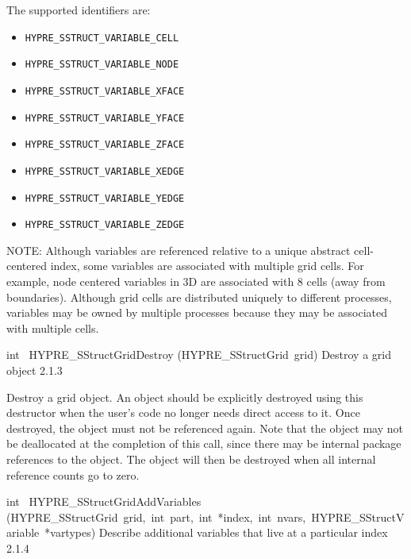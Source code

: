 \documentclass{article}
\begin{document}
\begin{cxxentry}
\begin{cxxentry}
\begin{cxxmacro}
\begin{cxxdoc}
The supported identifiers are:
\begin{itemize}
\item {\tt HYPRE\_SSTRUCT\_VARIABLE\_CELL}
\item {\tt HYPRE\_SSTRUCT\_VARIABLE\_NODE}
\item {\tt HYPRE\_SSTRUCT\_VARIABLE\_XFACE}
\item {\tt HYPRE\_SSTRUCT\_VARIABLE\_YFACE}
\item {\tt HYPRE\_SSTRUCT\_VARIABLE\_ZFACE}
\item {\tt HYPRE\_SSTRUCT\_VARIABLE\_XEDGE}
\item {\tt HYPRE\_SSTRUCT\_VARIABLE\_YEDGE}
\item {\tt HYPRE\_SSTRUCT\_VARIABLE\_ZEDGE}
\end{itemize}

NOTE: Although variables are referenced relative to a unique abstract
cell-centered index, some variables are associated with multiple grid cells.
For example, node centered variables in 3D are associated with 8 cells (away
from boundaries).  Although grid cells are distributed uniquely to different
processes, variables may be owned by multiple processes because they may be
associated with multiple cells.
\end{cxxdoc}
\end{cxxmacro}
\begin{cxxfunction}
{int\ }
        {HYPRE\_SStructGridDestroy}
        {(HYPRE\_SStructGrid\ grid)}
        {
Destroy a grid object}
        {2.1.3}
\begin{cxxdoc}

Destroy a grid object.  An object should be explicitly destroyed using this
destructor when the user's code no longer needs direct access to it.  Once
destroyed, the object must not be referenced again.  Note that the object may
not be deallocated at the completion of this call, since there may be
internal package references to the object.  The object will then be destroyed
when all internal reference counts go to zero.
\end{cxxdoc}
\end{cxxfunction}
\begin{cxxfunction}
{int\ }
        {HYPRE\_SStructGridAddVariables}
        {(HYPRE\_SStructGrid\ grid,\ int\ part,\ int\ *index,\ int\ nvars,\ HYPRE\_SStructVariable\ *vartypes)}
        {
Describe additional variables that live at a particular index}
        {2.1.4}
\begin{cxxdoc}


\end{cxxdoc}
\end{cxxfunction}
\end{cxxentry}
\end{cxxentry}
\end{document}
